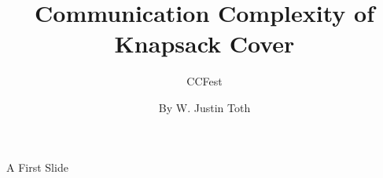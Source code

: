 \documentclass[10pt]{beamer}
\title{Communication Complexity of Knapsack Cover}
\subtitle{CCFest}
\date{}
\author{By W. Justin Toth}
\institute{CS860 - Communication Complexity}
\begin{document}
\maketitle

\begin{frame}{A First Slide}
\end{frame}
\end{document}
